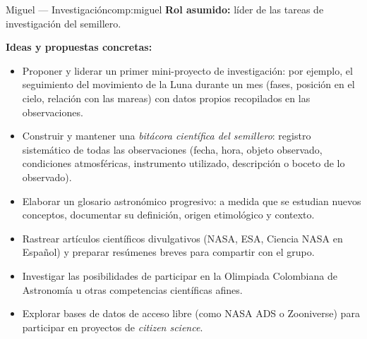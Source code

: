 \begin{compromiso}{Miguel — Investigación}{comp:miguel}
    \textbf{Rol asumido:} líder de las tareas de investigación del semillero.

    \medskip
    \textbf{Ideas y propuestas concretas:}
    \begin{itemize}[leftmargin=1.5em]
        \item Proponer y liderar un primer mini-proyecto de investigación: por ejemplo,
              el seguimiento del movimiento de la Luna durante un mes (fases, posición
              en el cielo, relación con las mareas) con datos propios recopilados
              en las observaciones.
        \item Construir y mantener una \textit{bitácora científica del semillero}:
              registro sistemático de todas las observaciones (fecha, hora, objeto
              observado, condiciones atmosféricas, instrumento utilizado, descripción
              o boceto de lo observado).
        \item Elaborar un glosario astronómico progresivo: a medida que se estudian
              nuevos conceptos, documentar su definición, origen etimológico y contexto.
        \item Rastrear artículos científicos divulgativos (NASA, ESA, Ciencia NASA en
              Español) y preparar resúmenes breves para compartir con el grupo.
        \item Investigar las posibilidades de participar en la Olimpiada Colombiana
              de Astronomía u otras competencias científicas afines.
        \item Explorar bases de datos de acceso libre (como NASA ADS o Zooniverse)
              para participar en proyectos de \textit{citizen science}.
    \end{itemize}
\end{compromiso}

